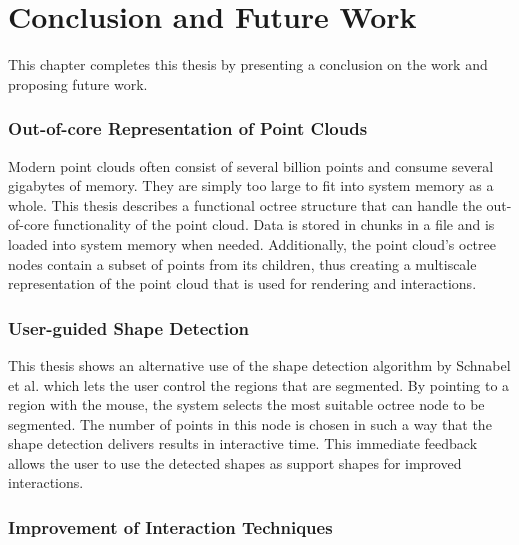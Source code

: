 \chapter{Conclusion and Future Work}
\label{chap:conclusion}


This chapter completes this thesis by presenting a conclusion on the work and proposing future work.

\subsection{Out-of-core Representation of Point Clouds}

Modern point clouds often consist of several billion points and consume several gigabytes of memory. They are simply too large to fit into system memory as a whole. This thesis describes a functional octree structure that can handle the out-of-core functionality of the point cloud. Data is stored in chunks in a file and is loaded into system memory when needed. Additionally, the point cloud's octree nodes contain a subset of points from its children, thus creating a multiscale representation of the point cloud that is used for rendering and interactions. 


\subsection{User-guided Shape Detection}

This thesis shows an alternative use of the shape detection algorithm by Schnabel et al.\cite{schnabel-2007-efficient} which lets the user control the regions that are segmented. By pointing to a region with the mouse, the system selects the most suitable octree node to be segmented. The number of points in this node is chosen in such a way that the shape detection delivers results in interactive time. This immediate feedback allows the user to use the detected shapes as support shapes for improved interactions. 


\subsection{Improvement of Interaction Techniques}

